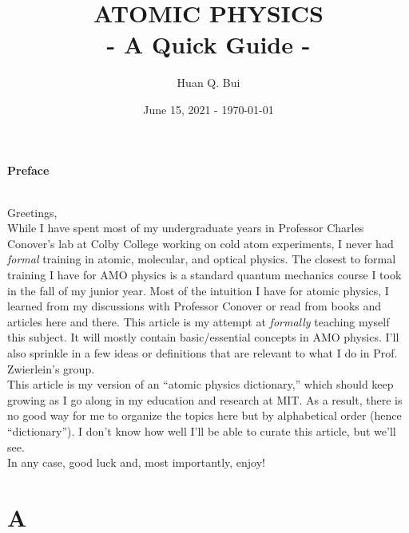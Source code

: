\documentclass{book}
\theoremstyle{definition}
\begin{document}
\begin{titlepage}\centering
 \clearpage
 \title{{\textsc{\textbf{ATOMIC PHYSICS}}}\\ \smallskip - A Quick Guide - \\}
 \author{\bigskip Huan Q. Bui}
 \date{June 15, 2021 - \today}
 \maketitle
 \thispagestyle{empty}
\end{titlepage}

\noindent \textbf{Preface}


$\,$\\


\noindent Greetings, \\


While I have spent most of my undergraduate years in Professor Charles Conover's lab at Colby College working on cold atom experiments, I never had \textit{formal} training in atomic, molecular, and optical physics. The closest to formal training I have for AMO physics is a standard quantum mechanics course I took in the fall of my junior year. Most of the intuition I have for atomic physics, I learned from my discussions with Professor Conover or read from books and articles here and there. This article is my attempt at \textit{formally} teaching myself this subject. It will mostly contain basic/essential concepts in AMO physics. I'll also sprinkle in a few ideas or definitions that are relevant to what I do in Prof. Zwierlein's group. \\

This article is my version of an ``atomic physics dictionary,'' which should keep growing as I go along in my education and research at MIT. As a result, there is no good way for me to organize the topics here but by alphabetical order (hence ``dictionary''). I don't know how well I'll be able to curate this article, but we'll see.\\


In any case, good luck and, most importantly, enjoy!


\newpage




\chapter*{A}
\end{document}
